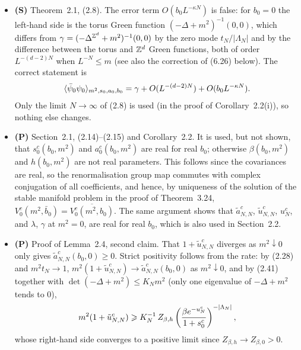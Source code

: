 \documentclass[11pt]{amsart}
\numberwithin{equation}{section}
\newcommand{\tu}{\tilde u_{N,N}}
\begin{document}
\begin{itemize}
\item \textbf{(S)} Theorem~2.1, (2.8). The error term $O(b_0L^{-\kappa N})$ is false: for
  $b_0=0$ the left-hand side is the torus Green function $(-\Delta+m^2)^{-1}(0,0)$, which differs
  from $\gamma=(-\Delta^{\mathbb{Z}^d}+m^2)^{-1}(0,0)$ by the zero mode $t_N/|\Lambda_N|$ and by the
  difference between the torus and $\mathbb{Z}^d$ Green functions, both of order $L^{-(d-2)N}$ when
  $L^{-N}\le m$ (see also the correction of (6.26) below). The correct statement is
  \begin{equation*}
    \langle \bar\psi_0\psi_0 \rangle_{m^2,s_0,a_0,b_0} = \gamma + O(L^{-(d-2)N}) + O(b_0L^{-\kappa N}).
  \end{equation*}
  Only the limit $N\to\infty$ of (2.8) is used (in the proof of Corollary~2.2(i)), so nothing
  else changes.

\item \textbf{(P)} Section~2.1, (2.14)--(2.15) and Corollary~2.2. It is used, but not shown,
  that $s_0^c(b_0,m^2)$ and $a_0^c(b_0,m^2)$ are real for real $b_0$; otherwise $\beta(b_0,m^2)$
  and $h(b_0,m^2)$ are not real parameters. This follows since the covariances are real, so
  the renormalisation group map commutes with complex conjugation of all coefficients, and
  hence, by uniqueness of the solution of the stable manifold problem in the proof of
  Theorem~3.24, $V_0^c(m^2,\bar b_0)=\overline{V_0^c(m^2,b_0)}$. The same argument shows that
  $\tilde a^c_{N,N}$, $\tilde u^c_{N,N}$, $u_N^c$, and $\lambda$, $\gamma$ at $m^2=0$, are real for
  real $b_0$, which is also used in Section~2.2.

\item \textbf{(P)} Proof of Lemma~2.4, second claim. That $1+\tu^c$ diverges as $m^2\downarrow 0$
  only gives $\tilde a^c_{N,N}(b_0,0)\ge 0$. Strict positivity follows from the rate:
  by (2.28) and $m^2t_N\to1$, $m^2(1+\tu^c)\to\tilde a^c_{N,N}(b_0,0)$ as $m^2\downarrow0$, and by
  (2.41) together with $\det(-\Delta+m^2)\le K_Nm^2$ (only one eigenvalue of $-\Delta+m^2$ tends
  to $0$),
  \begin{equation*}
    m^2(1+\tu^c) \geq K_N^{-1}\,Z_{\beta,h}\pa{\frac{\beta e^{-u_N^c}}{1+s_0^c}}^{-|\Lambda_N|},
  \end{equation*}
  whose right-hand side converges to a positive limit since $Z_{\beta,h}\to Z_{\beta,0}>0$.
\end{itemize}
\end{document}
